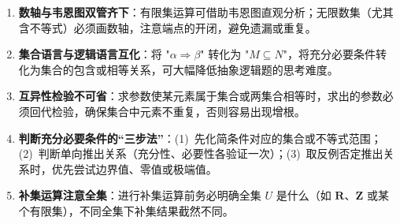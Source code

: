 \documentclass[11pt]{ctexrep}
\begin{document}
\begin{enumerate}
    \item \textbf{数轴与韦恩图双管齐下}：有限集运算可借助韦恩图直观分析；无限数集（尤其含不等式）必须画数轴，注意端点的开闭，避免遗漏或重复。
    \item \textbf{集合语言与逻辑语言互化}：将 "$\alpha \Rightarrow \beta$" 转化为 "$M \subseteq N$"，将充分必要条件转化为集合的包含或相等关系，可大幅降低抽象逻辑题的思考难度。
    \item \textbf{互异性检验不可省}：求参数使某元素属于集合或两集合相等时，求出的参数必须回代检验，确保集合中元素不重复，否则容易出现增根。
    \item \textbf{判断充分必要条件的“三步法”}：(1)~先化简条件对应的集合或不等式范围；(2)~判断单向推出关系（充分性、必要性各验证一次）；(3)~取反例否定推出关系时，优先尝试边界值、零值或极端值。
    \item \textbf{补集运算注意全集}：进行补集运算前务必明确全集 $U$ 是什么（如 $\mathbf{R}$、$\mathbf{Z}$ 或某个有限集），不同全集下补集结果截然不同。
\end{enumerate}
\end{document}
